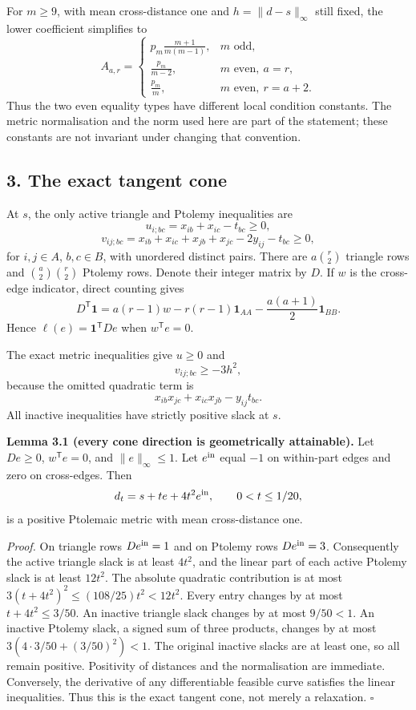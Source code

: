 \documentclass[11pt,a4paper]{article}
\begin{document}
For \(m\ge9\), with mean cross-distance one and \(h=\|d-s\|_\infty\)
still fixed, the lower coefficient simplifies to \[\boxed{
A_{a,r}=\begin{cases}
\displaystyle p_m\frac{m+1}{m(m-1)},&m\text{ odd},\\[1mm]
\displaystyle\frac{p_m}{m-2},&m\text{ even},\ a=r,\\[1mm]
\displaystyle\frac{p_m}{m},&m\text{ even},\ r=a+2.
\end{cases}}\] Thus the two even equality types have different local
condition constants. The metric normalisation and the norm used here are
part of the statement; these constants are not invariant under changing
that convention.

\subsection{3. The exact tangent cone}\label{the-exact-tangent-cone}

At \(s\), the only active triangle and Ptolemy inequalities are
\[u_{i;bc}=x_{ib}+x_{ic}-t_{bc}\ge0,\]
\[v_{ij;bc}=x_{ib}+x_{ic}+x_{jb}+x_{jc}-2y_{ij}-t_{bc}\ge0,\] for
\(i,j\in A\), \(b,c\in B\), with unordered distinct pairs. There are
\(a\binom r2\) triangle rows and \(\binom a2\binom r2\) Ptolemy rows.
Denote their integer matrix by \(D\). If \(w\) is the cross-edge
indicator, direct counting gives
\[D^{\mathsf T}\mathbf1=a(r-1)w-r(r-1)\mathbf1_{AA}
-\frac{a(a+1)}2\mathbf1_{BB}.\] Hence \(\ell(e)=\mathbf1^{\mathsf T}De\)
when \(w^{\mathsf T}e=0\).

The exact metric inequalities give \(u\ge0\) and \[v_{ij;bc}\ge-3h^2,\]
because the omitted quadratic term is
\[x_{ib}x_{jc}+x_{ic}x_{jb}-y_{ij}t_{bc}.\] All inactive inequalities
have strictly positive slack at \(s\).

\textbf{Lemma 3.1 (every cone direction is geometrically attainable).}
Let \(De\ge0\), \(w^{\mathsf T}e=0\), and \(\|e\|_\infty\le1\). Let
\(e^{\rm in}\) equal \(-1\) on within-part edges and zero on
cross-edges. Then \[d_t=s+te+4t^2e^{\rm in},\qquad 0<t\le1/20,\] is a
positive Ptolemaic metric with mean cross-distance one.

\emph{Proof.} On triangle rows \(De^{\rm in}=1\) and on Ptolemy rows
\(De^{\rm in}=3\). Consequently the active triangle slack is at least
\(4t^2\), and the linear part of each active Ptolemy slack is at least
\(12t^2\). The absolute quadratic contribution is at most
\(3(t+4t^2)^2\le(108/25)t^2<12t^2\). Every entry changes by at most
\(t+4t^2\le3/50\). An inactive triangle slack changes by at most
\(9/50<1\). An inactive Ptolemy slack, a signed sum of three products,
changes by at most \(3(4\cdot3/50+(3/50)^2)<1\). The original inactive
slacks are at least one, so all remain positive. Positivity of distances
and the normalisation are immediate. Conversely, the derivative of any
differentiable feasible curve satisfies the linear inequalities. Thus
this is the exact tangent cone, not merely a relaxation. \(\square\)
\end{document}
